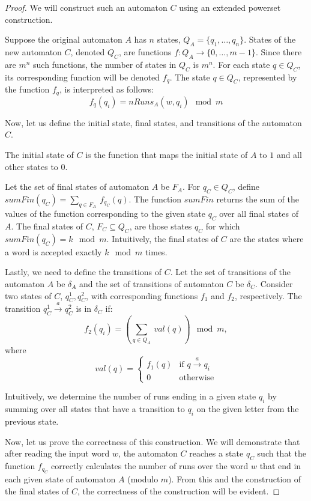 \documentclass[12pt]{article}
\theoremstyle{definition}
\begin{document}
\begin{proof}
    We will construct such an automaton $C$ using an extended powerset construction.

    Suppose the original automaton $A$ has $n$ states, $Q_A = \{q_1, \ldots, q_n\}$. States of the new automaton $C$, denoted $Q_C$, are functions $f: Q_A \rightarrow \{0, \ldots, m-1 \}$. Since there are $m^n$ such functions, the number of states in $Q_C$ is $m^n$. For each state $q \in Q_C$, its corresponding function will be denoted $f_q$. The state $q \in Q_C$, represented by the function $f_q$, is interpreted as follows:
    $$f_q(q_i) = nRuns_A(w, q_i) \mod m$$

    Now, let us define the initial state, final states, and transitions of the automaton $C$.

    The initial state of $C$ is the function that maps the initial state of $A$ to $1$ and all other states to $0$.

    Let the set of final states of automaton $A$ be $F_A$. For $q_C \in Q_C$, define $sumFin(q_C) = \sum_{q \in F_A} \ f_{q_C}(q)$. The function $sumFin$ returns the sum of the values of the function corresponding to the given state $q_C$ over all final states of $A$. The final states of $C$, $F_C \subseteq Q_C$, are those states $q_C$ for which $sumFin(q_C) = k \mod m$. Intuitively, the final states of $C$ are the states where a word is accepted exactly $k \mod m$ times.

    Lastly, we need to define the transitions of $C$. Let the set of transitions of the automaton $A$ be $\delta_A$ and the set of transitions of automaton $C$ be $\delta_C$. Consider two states of $C$, $q_C^1, q_C^2$, with corresponding functions $f_1$ and $f_2$, respectively. The transition $q_C^1 \xrightarrow{a} q_C^2$ is in $\delta_C$ if:
    $$f_2(q_i) = (\sum_{q \in Q_A} \ val(q)) \mod m,$$
    where
    \begin{equation*}
        val(q) =
            \begin{cases}
            f_1(q) & \text{if $q \xrightarrow{a} q_i$} \\
            0 & \text{otherwise}
            \end{cases}       
    \end{equation*}

    Intuitively, we determine the number of runs ending in a given state $q_i$ by summing over all states that have a transition to $q_i$ on the given letter from the previous state.

    Now, let us prove the correctness of this construction. We will demonstrate that after reading the input word $w$, the automaton $C$ reaches a state $q_C$ such that the function $f_{q_C}$ correctly calculates the number of runs over the word $w$ that end in each given state of automaton $A$ (modulo $m$). From this and the construction of the final states of $C$, the correctness of the construction will be evident.


\end{proof}
\end{document}
